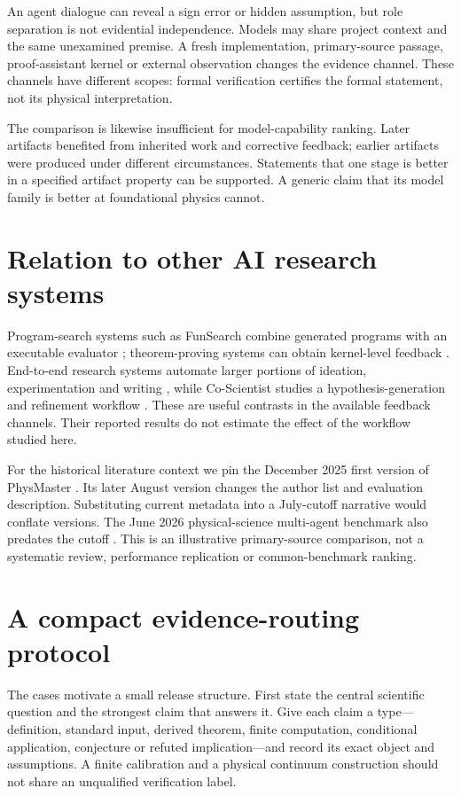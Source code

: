 \documentclass[11pt,a4paper]{article}
\begin{document}
An agent dialogue can reveal a sign error or hidden assumption, but role
separation is not evidential independence. Models may share project context
and the same unexamined premise. A fresh implementation, primary-source
passage, proof-assistant kernel or external observation changes the evidence
channel. These channels have different scopes: formal verification certifies
the formal statement, not its physical interpretation.

The comparison is likewise insufficient for model-capability ranking. Later
artifacts benefited from inherited work and corrective feedback; earlier
artifacts were produced under different circumstances. Statements that one
stage is better in a specified artifact property can be supported. A generic
claim that its model family is better at foundational physics cannot.

\section{Relation to other AI research systems}
Program-search systems such as FunSearch combine generated programs with an
executable evaluator \cite{FunSearch2024}; theorem-proving systems can obtain
kernel-level feedback \cite{Polu2021}. End-to-end research systems automate
larger portions of ideation, experimentation and writing
\cite{AIScientist2026}, while Co-Scientist studies a hypothesis-generation
and refinement workflow \cite{CoScientist2026}. These are useful contrasts in
the available feedback channels. Their reported results do not estimate the
effect of the workflow studied here.

For the historical literature context we pin the December 2025 first version
of PhysMaster \cite{PhysMasterV1}. Its later August version changes the
author list and evaluation description. Substituting current metadata into
a July-cutoff narrative would conflate versions. The June 2026 physical-science
multi-agent benchmark also predates the cutoff \cite{PhysicsAgents2026}.
This is an illustrative primary-source comparison, not a systematic review,
performance replication or common-benchmark ranking.

\section{A compact evidence-routing protocol}
The cases motivate a small release structure. First state the central
scientific question and the strongest claim that answers it. Give each
claim a type---definition, standard input, derived theorem, finite computation,
conditional application, conjecture or refuted implication---and record its
exact object and assumptions. A finite calibration and a physical continuum
construction should not share an unqualified verification label.
\end{document}
